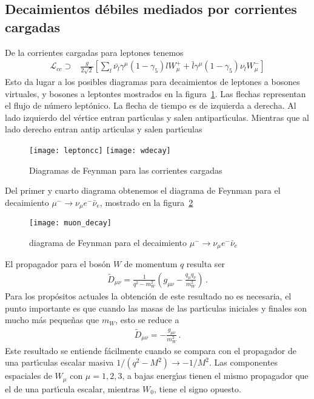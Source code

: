 \subsection{Decaimientos d\'ebiles mediados por corrientes cargadas}
De la corrientes cargadas para leptones tenemos
\begin{align}
  \mathcal{L}_{cc}\supset&\frac{g}{2\sqrt{2}}\left[\sum_l\bar{\nu_l}\gamma^\mu(1-\gamma_5)l W_\mu^++\bar{l}\gamma^\mu(1-\gamma_5)\nu_l W_\mu^-\right]
\end{align}
Esto da lugar a los posibles diagramas para decaimientos de leptones a bosones virtuales, y bosones a leptontes mostrados en la figura~\ref{fig:leptoncc}. Las flechas representan el flujo de n\'umero lept\'onico. La flecha de tiempo es de izquierda a derecha. Al lado izquierdo del v\'ertice entran part\'\i culas y salen antipart\'\i culas. Mientras que al lado derecho entran antip art\'\i culas y salen part\'\i culas
\begin{figure}
  \centering
  \texttt{[image: leptoncc]}
\qquad  \texttt{[image: wdecay]}

  \caption{Diagramas de Feynman para las corrientes cargadas}
  \label{fig:leptoncc}
\end{figure}
Del primer y cuarto diagrama obtenemos el diagrama de Feynman para el decaimiento $\mu^-\to \nu_\mu e^-\bar{\nu}_e$, mostrado en la figura~\ref{fig:muondecay}
\begin{figure}
  \centering
  \texttt{[image: muon\_decay]}
  \caption{diagrama de Feynman para el decaimiento $\mu^-\to \nu_\mu e^-\bar{\nu}_e$}
  \label{fig:muondecay}
\end{figure}
El propagador para el bos\'on $W$ de momentum $q$ resulta ser
\begin{align}
  \widetilde{D}_{\mu\nu}=\frac{1}{q^2-m_W^2}\left(g_{\mu\nu}-\frac{q_\mu q_\nu}{m_W^2}\right)\,.
\end{align}
Para los prop\'ositos actuales la obtenci\'on de este resultado no es necesaria, el punto importante es que cuando las masas de las part\'\i culas iniciales y finales son mucho m\'as peque\~nas que $m_W$, esto se reduce a
\begin{align}
  \widetilde{D}_{\mu\nu}=-\frac{g_{\mu\nu}}{m_W^2}\,.
\end{align}
Este resultado se entiende f\'acilmente cuando se compara con el propagador de una part\'\i culas escalar masiva $1/(q^2-M^2)\to-1/M^2$. Las componentes espaciales de $W_\mu$ con $\mu=1,2,3$, a bajas energ\'\i as tienen el mismo propagador que el de una part\'\i cula escalar, mientras $W_0$, tiene el signo opuesto.

